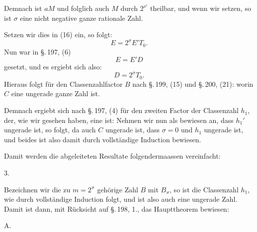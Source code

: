 Demnach ist $aM$ und folglich auch $M$ durch $2^{\nu'}$ theilbar,
und wenn wir
setzen, so ist $\sigma$ eine nicht negative ganze rationale Zahl.

Setzen wir dies in (16) ein, so folgt:
\[ E = 2^\sigma E' T_0. \]
Nun war in \S.\,197, (6)
\[ E = E' D \]
gesetzt, und es ergiebt sich also:
\[ D = 2^\sigma T_0. \]
Hieraus folgt für den Classenzahlfactor $B$ nach \S.\,199, (15)
und \S.\,200, (21):
worin $C$ eine ungerade ganze Zahl ist.

Demnach ergiebt sich nach \S.\,197, (4) für den zweiten Factor
der Classenzahl $h_1$, der, wie wir gesehen haben, eine  ist:
Nehmen wir nun als bewiesen an, dass $h_1'$ ungerade ist, so
folgt, da auch $C$ ungerade ist, dass $\sigma = 0$ und $h_1$
ungerade ist, und beides ist also damit durch vollständige
Induction bewiesen.

Damit werden die abgeleiteten Resultate folgendermaassen
vereinfacht:

3. 

Bezeichnen wir die zu $m = 2^\varkappa$ gehörige Zahl $B$ mit
$B_\varkappa$, so ist die Classenzahl $h_1$, wie durch
vollständige Induction folgt,
und ist also auch eine ungerade Zahl. Damit ist dann, mit
Rücksicht auf \S.\,198, 1., das Haupttheorem bewiesen:

A. 
